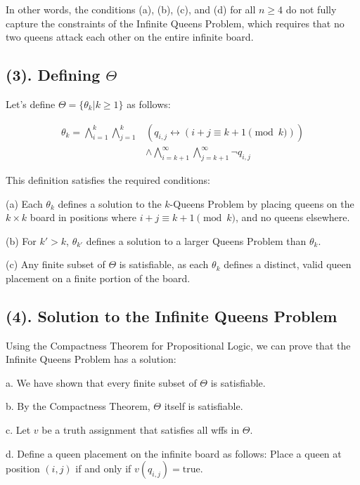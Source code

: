 \documentclass{article}
\begin{document}
In other words, the conditions (a), (b), (c), and (d) for all $n \geq 4$ do not fully capture the constraints of the Infinite Queens Problem, which requires that no two queens attack each other on the entire infinite board.

\newpage

\subsection*{(3). Defining $\Theta$}

Let's define $\Theta = \{\theta_k | k \geq 1\}$ as follows:

\begin{align*}
\theta_k = \bigwedge_{i=1}^k \bigwedge_{j=1}^k &\left(q_{i,j} \leftrightarrow (i+j \equiv k+1 \pmod{k})\right) \\
&\wedge \bigwedge_{i=k+1}^\infty \bigwedge_{j=k+1}^\infty \neg q_{i,j}
\end{align*}

This definition satisfies the required conditions:

(a) Each $\theta_k$ defines a solution to the $k$-Queens Problem by placing queens on the $k \times k$ board in positions where $i+j \equiv k+1 \pmod{k}$, and no queens elsewhere.

(b) For $k' > k$, $\theta_{k'}$ defines a solution to a larger Queens Problem than $\theta_k$.

(c) Any finite subset of $\Theta$ is satisfiable, as each $\theta_k$ defines a distinct, valid queen placement on a finite portion of the board.
\newpage


\subsection*{(4). Solution to the Infinite Queens Problem}

Using the Compactness Theorem for Propositional Logic, we can prove that the Infinite Queens Problem has a solution:

a. We have shown that every finite subset of $\Theta$ is satisfiable.

b. By the Compactness Theorem, $\Theta$ itself is satisfiable.

c. Let $v$ be a truth assignment that satisfies all wffs in $\Theta$.

d. Define a queen placement on the infinite board as follows:
   Place a queen at position $(i,j)$ if and only if $v(q_{i,j}) = \text{true}$.
\end{document}
